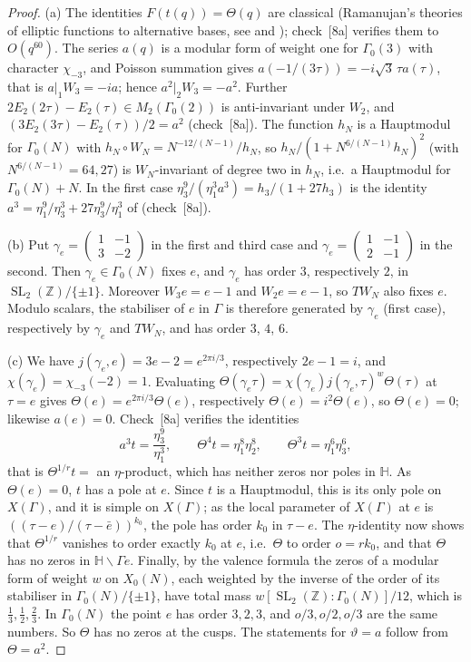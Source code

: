 \documentclass[11pt,a4paper]{article}
\theoremstyle{definition}\newtheorem{definition}[theorem]{Definition}
\theoremstyle{remark}\newtheorem{remark}[theorem]{Remark}
\newcommand{\Z}{\mathbb Z}
\newcommand{\Hb}{\mathbb H}
\DeclareMathOperator{\SL}{SL}
\newcommand{\bmat}[4]{\left(\begin{smallmatrix}#1&#2\\#3&#4\end{smallmatrix}\right)}
\numberwithin{equation}{section}
\begin{document}
\begin{proof}
(a) The identities $F(t(q))=\Theta(q)$ are classical (Ramanujan's theories of elliptic functions to alternative bases,
see \cite{BBG94,Co17} and \cite[App.~B, C]{Beu26}); check~[8a] verifies them to $O(q^{60})$. The series $a(q)$ is a modular form of
weight one for $\Gamma_0(3)$ with character $\chi_{-3}$, and Poisson summation gives $a(-1/(3\tau))=-i\sqrt3\,\tau a(\tau)$,
that is $a|_1W_3=-ia$; hence $a^2|_2W_3=-a^2$. Further $2E_2(2\tau)-E_2(\tau)\in M_2(\Gamma_0(2))$ is anti-invariant under
$W_2$, and $(3E_2(3\tau)-E_2(\tau))/2=a^2$ (check~[8a]). The function $h_N$ is a Hauptmodul for $\Gamma_0(N)$ with
$h_N\circ W_N=N^{-12/(N-1)}/h_N$, so $h_N/(1+N^{6/(N-1)}h_N)^2$ (with $N^{6/(N-1)}=64,27$) is $W_N$-invariant of degree two in $h_N$, i.e.\ a
Hauptmodul for $\Gamma_0(N)+N$. In the first case $\eta_3^9/(\eta_1^3a^3)=h_3/(1+27h_3)$ is the identity
$a^3=\eta_1^9/\eta_3^3+27\eta_3^9/\eta_1^3$ of \cite{BBG94} (check~[8a]).

(b) Put $\gamma_e=\bmat1{-1}3{-2}$ in the first and third case and $\gamma_e=\bmat1{-1}2{-1}$ in the second. Then
$\gamma_e\in\Gamma_0(N)$ fixes $e$, and $\gamma_e$ has order $3$, respectively $2$, in $\SL_2(\Z)/\{\pm1\}$.
Moreover $W_3e=e-1$ and $W_2e=e-1$, so $T W_N$ also fixes $e$. Modulo scalars, the stabiliser of $e$ in $\Gamma$ is
therefore generated by $\gamma_e$ (first case), respectively by $\gamma_e$ and $TW_N$, and has order $3$, $4$, $6$.

(c) We have $j(\gamma_e,e)=3e-2=e^{2\pi i/3}$, respectively $2e-1=i$, and $\chi(\gamma_e)=\chi_{-3}(-2)=1$. Evaluating
$\Theta(\gamma_e\tau)=\chi(\gamma_e)j(\gamma_e,\tau)^w\Theta(\tau)$ at $\tau=e$ gives $\Theta(e)=e^{2\pi i/3}\Theta(e)$,
respectively $\Theta(e)=i^2\Theta(e)$, so $\Theta(e)=0$; likewise $a(e)=0$. Check~[8a] verifies the identities
\[
a^3t=\frac{\eta_3^9}{\eta_1^3},\qquad \Theta^4t=\eta_1^8\eta_2^8,\qquad \Theta^3t=\eta_1^6\eta_3^6,
\]
that is $\Theta^{1/r}t=$ an $\eta$-product, which has neither zeros nor poles in $\Hb$. As $\Theta(e)=0$, $t$ has a pole
at $e$. Since $t$ is a Hauptmodul, this is its only pole on $X(\Gamma)$, and it is simple on $X(\Gamma)$; as the local
parameter of $X(\Gamma)$ at $e$ is $((\tau-e)/(\tau-\bar e))^{k_0}$, the pole has order $k_0$ in $\tau-e$. The
$\eta$-identity now shows that $\Theta^{1/r}$ vanishes to order exactly $k_0$ at $e$, i.e.\ $\Theta$ to order $o=rk_0$,
and that $\Theta$ has no zeros in $\Hb\smallsetminus\Gamma e$. Finally, by the valence formula the zeros of a modular form
of weight $w$ on $X_0(N)$, each weighted by the inverse of the order of its stabiliser in
$\Gamma_0(N)/\{\pm1\}$, have total mass $w[\SL_2(\Z):\Gamma_0(N)]/12$, which is $\frac13,\frac12,\frac23$. In
$\Gamma_0(N)$ the point $e$ has order $3,2,3$, and $o/3,o/2,o/3$ are the same numbers. So $\Theta$ has no zeros at the
cusps. The statements for $\vartheta=a$ follow from $\Theta=a^2$.
\end{proof}
\end{document}
